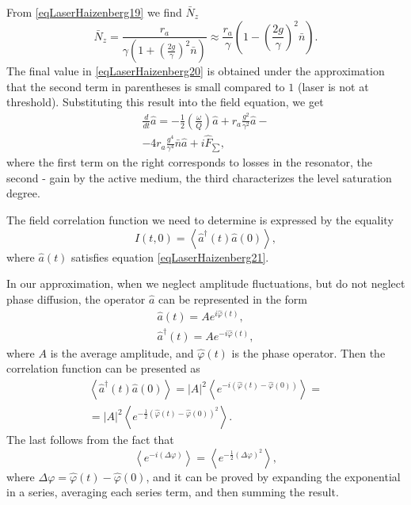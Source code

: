 From \eqref{eqLaserHaizenberg19} we find $\bar{N}_z$
\begin{equation}
\bar{N}_z = \frac{r_a}{\gamma\left(1+ \left(\frac{2
    g}{\gamma}\right)^2 \bar{n}\right)} 
\approx
\frac{r_a}{\gamma}
\left(1 - \left(\frac{2 g}{\gamma}\right)^2
\bar{n}\right).
\label{eqLaserHaizenberg20}
\end{equation}
The final value in \eqref{eqLaserHaizenberg20} is obtained under the approximation that the second term in parentheses is small compared to $1$ (laser is not
at threshold). Substituting this result into the field equation, we get
\begin{eqnarray}
\frac{d}{dt}\hat{a} = -\frac{1}{2}\left(\frac{\omega}{Q}\right)\hat{a}
+ r_a \frac{g^2}{\gamma^2}\hat{a} - 
\nonumber \\
- 4 r_a\frac{g^4}{\gamma^4} \bar{n}\hat{a} + i \hat{F}_{\sum},
\label{eqLaserHaizenberg21}
\end{eqnarray}
where the first term on the right corresponds to losses in the resonator, the second -
gain by the active medium, the third characterizes the level saturation degree. 

The field correlation function we need to determine is expressed by the equality
\begin{equation}
I\left(t, 0\right) = \left<\hat{a}^{\dag}\left(t\right)\hat{a}\left(0\right)\right>,
\nonumber
\end{equation}
where $\hat{a}\left(t\right)$ satisfies equation
\eqref{eqLaserHaizenberg21}. 

In our approximation, when we neglect amplitude fluctuations,
but do not neglect phase diffusion, the operator $\hat{a}$ can be
represented in the form
\begin{eqnarray}
\hat{a}\left(t\right) = A e^{i\hat{\varphi}\left(t\right)},
\nonumber \\
\hat{a}^{\dag}\left(t\right) = A e^{-i\hat{\varphi}\left(t\right)},
\label{eqLaserHaizenbergAConstPhi}
\end{eqnarray}
where $A$ is the average amplitude, and $\hat{\varphi}\left(t\right)$ is the phase operator. Then the correlation function can be presented as
\begin{eqnarray}
\left<\hat{a}^{\dag}\left(t\right)\hat{a}\left(0\right)\right> =
\left|A\right|^2 \left<e^{-i\left(\hat{\varphi}\left(t\right) -
  \hat{\varphi}\left(0\right)\right)}\right> = 
\nonumber \\
= 
\left|A\right|^2 \left<e^{-\frac{1}{2}\left(\hat{\varphi}\left(t\right) -
  \hat{\varphi}\left(0\right)\right)^2}\right>.
\label{eqLaserHaizenbergTaskMiddle}
\end{eqnarray}
The last follows from the fact that 
\begin{equation}
\left<e^{-i \left(\Delta \varphi\right)}\right> = 
\left<e^{-\frac{1}{2} \left(\Delta \varphi\right)^2}\right>,
\nonumber
\end{equation}
where $\Delta \varphi = \hat{\varphi}\left(t\right) -
\hat{\varphi}\left(0\right)$, and it can be proved by expanding
the exponential in a series, averaging each series term, and then summing
the result.


